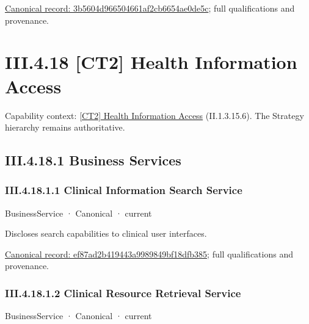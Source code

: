 {\footnotesize \href{../../../../continuum/business/business-function/3b5604d966504661af2cb6654ae0de5c.md}{Canonical record: 3b5604d966504661af2cb6654ae0de5c}; full qualifications and provenance.}\par
\section*{III.4.18 [CT2] Health Information Access}
\label{navigation:III.4.18}

{\small Capability context: \hyperref[element:cc253aea3c5f489da0502df74dde1669]{[CT2] Health Information Access} (II.1.3.15.6). The Strategy hierarchy remains authoritative.}\par
\subsection*{III.4.18.1 Business Services}
\label{navigation:III.4.18.1}

\subsubsection*{III.4.18.1.1 Clinical Information Search Service}
\label{navigation:III.4.18.1.1}

\label{element:ef87ad2b419443a9989849bf18dfb385}
{\small BusinessService · Canonical · current}\par

Discloses search capabilities to clinical user interfaces.


{\footnotesize \href{../../../../continuum/business/business-service/ef87ad2b419443a9989849bf18dfb385.md}{Canonical record: ef87ad2b419443a9989849bf18dfb385}; full qualifications and provenance.}\par
\subsubsection*{III.4.18.1.2 Clinical Resource Retrieval Service}
\label{navigation:III.4.18.1.2}

\label{element:3cdde3bb6a204c46b08468e080f2545a}
{\small BusinessService · Canonical · current}\par

